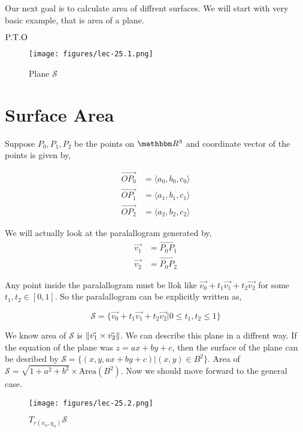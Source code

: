 \documentclass[Analysis-3]{subfiles}
\begin{document}
Our next goal is to calculate area of diffrent surfaces. We will start with very basic example, that is area of a plane. 

\vfill
$\hfill \text{P.T.O}$

\pagebreak

\begin{wrapfigure}{r}{0.45\textwidth}
    \centering
   \texttt{[image: figures/lec-25.1.png]}
    \caption{Plane $\mathcal{S}$}
\end{wrapfigure} 

\section{Surface Area} \label{marker}

Suppose $P_0,P_1,P_2$ be the points on $\R^3$ and coordinate vector of the points is given by,

\begin{align*}
    \vec{OP_0} &= \langle a_0,b_0,c_0 \rangle \\
    \vec{OP_1} &= \langle a_1,b_1,c_1 \rangle \\
    \vec{OP_2} &= \langle a_2,b_2,c_2 \rangle
\end{align*}

We will actually look at the paralallogram generated by,
\begin{align*}
    \vec{v_1} &= \vec{P_0P_1} \\
    \vec{v_2} &= \vec{P_0P_2}
\end{align*}

Any point inside the paralallogram must be llok like $\vec{v_0} + t_1 \vec{v_1} +t_2 \vec{v_2}$ for some $t_1,t_2 \in [0,1]$. So the paralallogram can be explicitly written as,

$$ \mathcal{S} = \{ \vec{v_0} + t_1 \vec{v_1} +t_2 \vec{v_2}  |  0 \le t_1,t_2 \le 1\} $$

We know area of $\mathcal{S}$ is $\norm{\vec{v_1}\times \vec{v_2}}$. We can describe this plane in a diffrent way. If the equation of the plane  was $z=ax+by+c$, then the surface of the plane can be desribed by $\mathcal{S} = \{(x , y, ax+by+c) | (x,y) \in B^2 \}$. Area of $\mathcal{S} = \sqrt{1+a^2+b^2} \times \text{Area}(B^2)$. Now we should move forward to the general case.

\begin{wrapfigure}{r}{0.50\textwidth}
    \centering
   \texttt{[image: figures/lec-25.2.png]}
    \caption{$T_{r(x_{\alpha},y_{\alpha})} \mathcal{S}$}
\end{wrapfigure} 
\end{document}
